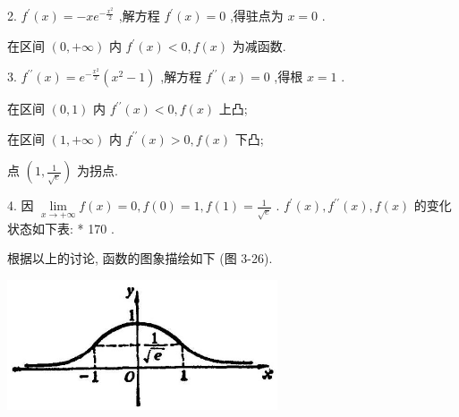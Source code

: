 \documentclass[lang=cn,newtx,10pt,scheme=chinese]{elegantbook}
\begin{document}
2. \({f}^{\prime }\left( x\right) = - x{e}^{-\frac{{x}^{2}}{2}}\) ,解方程 \({f}^{\prime }\left( x\right) = 0\) ,得驻点为 \(x = 0\) .

在区间 \(\left( {0, + \infty }\right)\) 内 \({f}^{\prime }\left( x\right) < 0,f\left( x\right)\) 为减函数.

3. \({f}^{\prime \prime }\left( x\right) = {e}^{-\frac{{x}^{2}}{2}}\left( {{x}^{2} - 1}\right)\) ,解方程 \({f}^{\prime \prime }\left( x\right) = 0\) ,得根 \(x = 1\) .

在区间 \(\left( {0,1}\right)\) 内 \({f}^{\prime \prime }\left( x\right) < 0,f\left( x\right)\) 上凸;

在区间 \(\left( {1, + \infty }\right)\) 内 \({f}^{\prime \prime }\left( x\right) > 0,f\left( x\right)\) 下凸;

点 \(\left( {1,\frac{1}{\sqrt{e}}}\right)\) 为拐点.

4. 因 \(\mathop{\lim }\limits_{{x \rightarrow + \infty }}f\left( x\right) = 0,f\left( 0\right) = 1,f\left( 1\right) = \frac{1}{\sqrt{e}}\) . \({f}^{\prime }\left( x\right) ,{f}^{\prime \prime }\left( x\right) ,f\left( x\right)\) 的变化状态如下表: * 170 .

\begin{center}
\end{center}

根据以上的讨论, 函数的图象描绘如下 (图 3-26).

\begin{center}
\includegraphics[max width=0.6\textwidth]{images/01912c18-5c3f-733d-b775-749ba9897a9d_174_141078.jpg}
\end{center}
\end{document}
